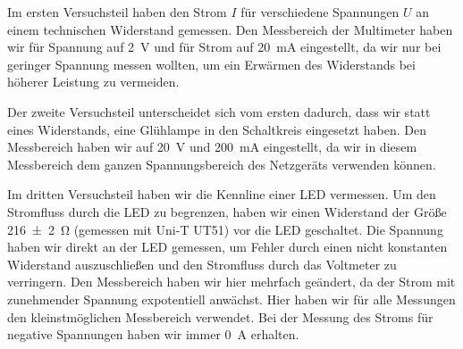 \documentclass[parskip, 12pt, DIV=16, openany]{scrartcl}
\begin{document}
Im ersten Versuchsteil haben den Strom $I$ für verschiedene Spannungen $U$ an einem technischen Widerstand gemessen. Den Messbereich der Multimeter haben wir für Spannung auf \SI{2}{\V} und für Strom auf \SI{20}{\mA} eingestellt, da wir nur bei geringer Spannung messen wollten, um ein Erwärmen des Widerstands bei höherer Leistung zu vermeiden. 

Der zweite Versuchsteil unterscheidet sich vom ersten dadurch, dass wir statt eines Widerstands, eine Glühlampe in den Schaltkreis eingesetzt haben. Den Messbereich haben wir auf \SI{20}{\V} und \SI{200}{\mA} eingestellt, da wir in diesem Messbereich dem ganzen Spannungsbereich des Netzgeräts verwenden können.

Im dritten Versuchsteil haben wir die Kennline einer LED vermessen. Um den Stromfluss durch die LED zu begrenzen, haben wir einen Widerstand der Größe \SI{216(2)}{\ohm} (gemessen mit Uni-T UT51) vor die LED geschaltet. Die Spannung haben wir direkt an der LED gemessen, um Fehler durch einen nicht konstanten Widerstand auszuschließen und den Stromfluss durch das Voltmeter zu verringern. Den Messbereich haben wir hier mehrfach geändert, da der Strom mit zunehmender Spannung expotentiell anwächst. Hier haben wir für alle Messungen den kleinstmöglichen Messbereich verwendet. Bei der Messung des Stroms für negative Spannungen haben wir immer \SI{0}{\A} erhalten.
\end{document}
